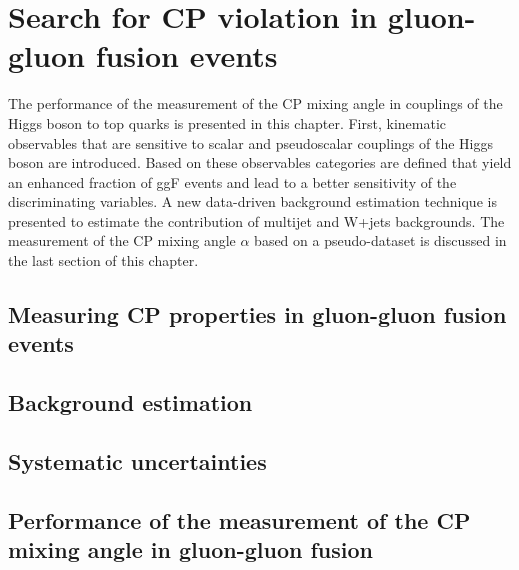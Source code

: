 \chapter{Search for CP violation in gluon-gluon fusion events}\label{chap:analysis}

The performance of the measurement of the CP mixing angle in couplings of the Higgs boson to
top quarks is presented in this chapter.
First, kinematic observables that are sensitive to 
scalar and pseudoscalar couplings of the Higgs boson are introduced. Based on these observables categories are defined that
yield an enhanced fraction of ggF events and lead to a better sensitivity of the discriminating variables.
A new data-driven background estimation technique is presented to estimate the contribution of multijet and W+jets backgrounds. 
The measurement of the CP mixing angle $\alpha$ based on a pseudo-dataset is discussed in the last section of this chapter.
\section{Measuring CP properties in gluon-gluon fusion events}



\section{Background estimation}\label{sec:background_estimation}



\section{Systematic uncertainties}\label{sec:systematic_uncertainties}



\section{Performance of the measurement of the CP mixing angle in gluon-gluon fusion}\label{sec:statistical_evaluation}

 
